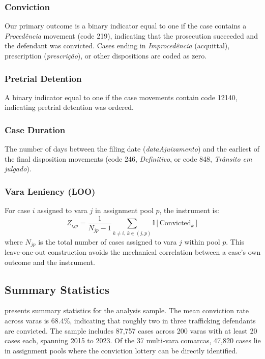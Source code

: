 \documentclass[12pt]{article}
\newcommand{\ind}{\mathbb{I}}
\begin{document}
\subsubsection*{Conviction} Our primary outcome is a binary indicator equal to one if the case contains a \textit{Proced\^encia} movement (code 219), indicating that the prosecution succeeded and the defendant was convicted. Cases ending in \textit{Improced\^encia} (acquittal), prescription (\textit{prescri\c{c}\~ao}), or other dispositions are coded as zero.

\subsubsection*{Pretrial Detention} A binary indicator equal to one if the case movements contain code 12140, indicating pretrial detention was ordered.

\subsubsection*{Case Duration} The number of days between the filing date (\textit{dataAjuizamento}) and the earliest of the final disposition movements (code 246, \textit{Definitivo}, or code 848, \textit{Tr\^ansito em julgado}).

\subsubsection*{Vara Leniency (LOO)} For case $i$ assigned to vara $j$ in assignment pool $p$, the instrument is:
\begin{equation}
Z_{ijp} = \frac{1}{N_{jp} - 1} \sum_{k \neq i,\, k \in (j,p)} \ind[\text{Convicted}_k]
\label{eq:leniency}
\end{equation}
where $N_{jp}$ is the total number of cases assigned to vara $j$ within pool $p$. This leave-one-out construction avoids the mechanical correlation between a case's own outcome and the instrument.

\subsection{Summary Statistics}



 presents summary statistics for the analysis sample. The mean conviction rate across varas is 68.4\%, indicating that roughly two in three trafficking defendants are convicted. The sample includes 87,757 cases across 200 varas with at least 20 cases each, spanning 2015 to 2023. Of the 37 multi-vara comarcas, 47,820 cases lie in assignment pools where the conviction lottery can be directly identified.
\end{document}
